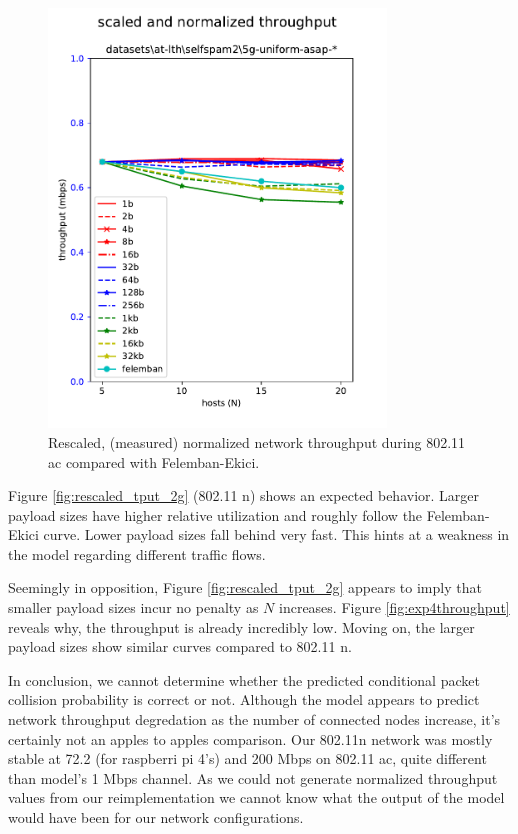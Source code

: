 \begin{figure}[tbp]
  \centering
  \includegraphics[width=0.8\textwidth]{images/rescaled_u.pdf}
  \caption{Rescaled, (measured) normalized network throughput during 802.11 ac compared with Felemban-Ekici.}
  \label{fig:rescaled_tput_5g}
\end{figure}

Figure \ref{fig:rescaled_tput_2g} (802.11 n) shows an expected behavior. Larger
payload sizes have higher relative utilization and roughly follow the
Felemban-Ekici curve. Lower payload sizes fall behind very fast. This hints at
a weakness in the model regarding different traffic flows.

Seemingly in opposition, Figure \ref{fig:rescaled_tput_2g} appears to imply
that smaller payload sizes incur no penalty as $N$ increases. Figure
\ref{fig:exp4throughput} reveals why, the throughput is already incredibly
low. Moving on, the larger payload sizes show similar curves compared to
802.11 n.

In conclusion, we cannot determine whether the predicted conditional packet
collision probability is correct or not. Although the model appears to predict
network throughput degredation as the number of connected nodes increase, it's
certainly not an apples to apples comparison. Our 802.11n network was mostly
stable at 72.2 (for raspberri pi 4's) and 200 Mbps on 802.11 ac, quite
different than model's 1 Mbps channel. As we could not generate normalized
throughput values from our reimplementation we cannot know what the output of
the model would have been for our network configurations.


